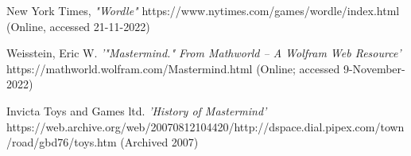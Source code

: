 \documentclass[12pt]{article}  %
\theoremstyle{definition}
\theoremstyle{remark}
\begin{document}
%
%
%
\begin{thebibliography}{99}

% 
%



%

%




New York Times,
{\em "Wordle"}
https://www.nytimes.com/games/wordle/index.html
(Online, accessed 21-11-2022)

Weisstein, Eric W.
{\em '"Mastermind." From Mathworld -- A Wolfram Web Resource'}
https://mathworld.wolfram.com/Mastermind.html
(Online; accessed 9-November-2022)

Invicta Toys and Games ltd.
{\em 'History of Mastermind'}
https://web.archive.org/web/20070812104420/http://dspace.dial.pipex.com/town/road/gbd76/toys.htm
(Archived 2007)


\end{thebibliography}
\end{document}
